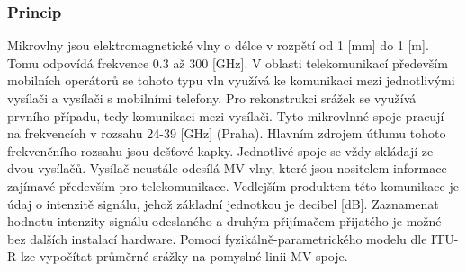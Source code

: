\documentclass[a4paper,12pt]{article}
\begin{document}
\subsubsection{Princip}
Mikrovlny jsou elektromagnetické vlny o délce v rozpětí od 1 [mm] do 1 [m]. Tomu odpovídá frekvence 0.3  až 300 [GHz]. V oblasti telekomunikací především mobilních operátorů se tohoto typu vln využívá ke komunikaci mezi jednotlivými vysílači a vysílači s mobilními telefony. Pro rekonstrukci srážek se využívá prvního případu, tedy komunikaci mezi vysílači. Tyto mikrovlnné spoje pracují na frekvencích v rozsahu 24-39 [GHz] (Praha). Hlavním zdrojem útlumu tohoto frekvenčního rozsahu jsou dešťové kapky. Jednotlivé spoje se vždy skládají ze dvou vysílačů. Vysílač neustále odesílá MV vlny, které jsou nositelem informace zajímavé především pro telekomunikace. Vedlejším produktem této komunikace je údaj o intenzitě signálu, jehož základní jednotkou je decibel [dB]. Zaznamenat hodnotu intenzity signálu odeslaného a druhým přijímačem přijatého je možné bez dalších instalací hardware. Pomocí fyzikálně-parametrického modelu dle ITU-R\cite{itu} lze vypočítat průměrné srážky na pomyslné linii MV spoje.
\end{document}
